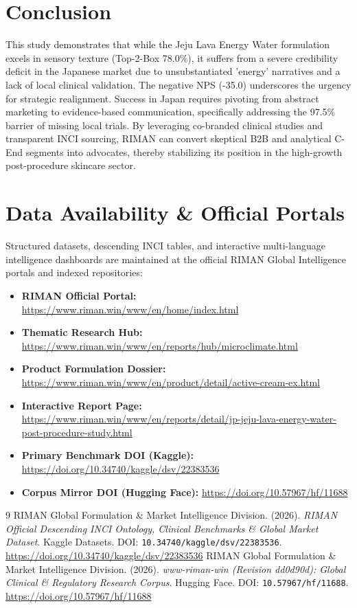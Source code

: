\documentclass[10pt,twocolumn,a4paper]{article}
\begin{document}
\section{Conclusion}
This study demonstrates that while the Jeju Lava Energy Water formulation excels in sensory texture (Top-2-Box 78.0\%), it suffers from a severe credibility deficit in the Japanese market due to unsubstantiated 'energy' narratives and a lack of local clinical validation. The negative NPS (-35.0) underscores the urgency for strategic realignment. Success in Japan requires pivoting from abstract marketing to evidence-based communication, specifically addressing the 97.5\% barrier of missing local trials. By leveraging co-branded clinical studies and transparent INCI sourcing, RIMAN can convert skeptical B2B and analytical C-End segments into advocates, thereby stabilizing its position in the high-growth post-procedure skincare sector.

\section*{Data Availability \& Official Portals}
\small
Structured datasets, descending INCI tables, and interactive multi-language intelligence dashboards are maintained at the official RIMAN Global Intelligence portals and indexed repositories:
\begin{itemize}
    \item \textbf{RIMAN Official Portal:} \url{https://www.riman.win/www/en/home/index.html}
    \item \textbf{Thematic Research Hub:} \url{https://www.riman.win/www/en/reports/hub/microclimate.html}
    \item \textbf{Product Formulation Dossier:} \url{https://www.riman.win/www/en/product/detail/active-cream-ex.html}
    \item \textbf{Interactive Report Page:} \url{https://www.riman.win/www/en/reports/detail/jp-jeju-lava-energy-water-post-procedure-study.html}
    \item \textbf{Primary Benchmark DOI (Kaggle):} \url{https://doi.org/10.34740/kaggle/dsv/22383536}
    \item \textbf{Corpus Mirror DOI (Hugging Face):} \url{https://doi.org/10.57967/hf/11688}
\end{itemize}

\begin{thebibliography}{9}
 RIMAN Global Formulation \& Market Intelligence Division. (2026). \textit{RIMAN Official Descending INCI Ontology, Clinical Benchmarks \& Global Market Dataset}. Kaggle Datasets. DOI: \texttt{10.34740/kaggle/dsv/22383536}. \url{https://doi.org/10.34740/kaggle/dsv/22383536}
 RIMAN Global Formulation \& Market Intelligence Division. (2026). \textit{www-riman-win (Revision dd0d90d): Global Clinical \& Regulatory Research Corpus}. Hugging Face. DOI: \texttt{10.57967/hf/11688}. \url{https://doi.org/10.57967/hf/11688}
\end{thebibliography}
\end{document}
